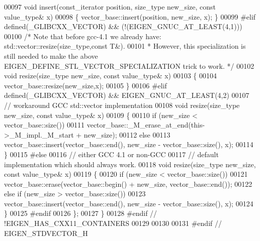 \begin{DoxyCode}
00097   \textcolor{keywordtype}{void} insert(const\_iterator position, size\_type new\_size, \textcolor{keyword}{const} value\_type& x)
00098   \{ vector\_base::insert(position, new\_size, x); \}
00099 \textcolor{preprocessor}{#elif defined(\_GLIBCXX\_VECTOR) && (!(EIGEN\_GNUC\_AT\_LEAST(4,1)))}
00100   \textcolor{comment}{/* Note that before gcc-4.1 we already have: std::vector::resize(size\_type,const T&).}
00101 \textcolor{comment}{   * However, this specialization is still needed to make the above EIGEN\_DEFINE\_STL\_VECTOR\_SPECIALIZATION
       trick to work. */}
00102   \textcolor{keywordtype}{void} resize(size\_type new\_size, \textcolor{keyword}{const} value\_type& x)
00103   \{
00104     vector\_base::resize(new\_size,x);
00105   \}
00106 \textcolor{preprocessor}{#elif defined(\_GLIBCXX\_VECTOR) && EIGEN\_GNUC\_AT\_LEAST(4,2)}
00107   \textcolor{comment}{// workaround GCC std::vector implementation}
00108   \textcolor{keywordtype}{void} resize(size\_type new\_size, \textcolor{keyword}{const} value\_type& x)
00109   \{
00110     \textcolor{keywordflow}{if} (new\_size < vector\_base::size())
00111       vector\_base::\_M\_erase\_at\_end(this->\_M\_impl.\_M\_start + new\_size);
00112     \textcolor{keywordflow}{else}
00113       vector\_base::insert(vector\_base::end(), new\_size - vector\_base::size(), x);
00114   \}
00115 \textcolor{preprocessor}{#else}
00116   \textcolor{comment}{// either GCC 4.1 or non-GCC}
00117   \textcolor{comment}{// default implementation which should always work.}
00118   \textcolor{keywordtype}{void} resize(size\_type new\_size, \textcolor{keyword}{const} value\_type& x)
00119   \{
00120     \textcolor{keywordflow}{if} (new\_size < vector\_base::size())
00121       vector\_base::erase(vector\_base::begin() + new\_size, vector\_base::end());
00122     \textcolor{keywordflow}{else} \textcolor{keywordflow}{if} (new\_size > vector\_base::size())
00123       vector\_base::insert(vector\_base::end(), new\_size - vector\_base::size(), x);
00124   \}
00125 \textcolor{preprocessor}{#endif}
00126   \};
00127 \}
00128 \textcolor{preprocessor}{#endif // !EIGEN\_HAS\_CXX11\_CONTAINERS}
00129 
00130 
00131 \textcolor{preprocessor}{#endif // EIGEN\_STDVECTOR\_H}
\end{DoxyCode}
